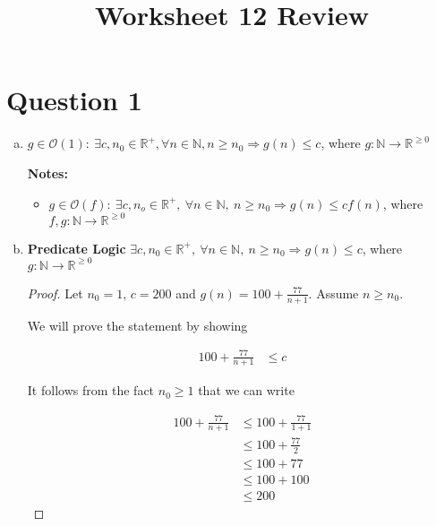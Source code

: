 \documentclass[12pt]{article}
\begin{document}
\title{Worksheet 12 Review}
\maketitle

\section*{Question 1}
\begin{enumerate}[a.]
    \item

    $g \in \mathcal{O}(1):\:\exists c,n_0 \in \mathbb{R}^{+}, \forall n \in
    \mathbb{N}, n \geq n_0 \Rightarrow g(n) \leq c$, where $g: \mathbb{N} \to \mathbb{R}^{\geq 0}$

    \bigskip

    \textbf{Notes:}

    \begin{itemize}
        \item

        $g \in \mathcal{O}(f):\:\exists c,n_o \in \mathbb{R}^{+},\:\forall n \in
        \mathbb{N},\:n \geq n_0 \Rightarrow g(n) \leq cf(n)$, where $f,g:\mathbb{N} \to \mathbb{R}^{\geq 0}$

    \end{itemize}

    \item

    \textbf{Predicate Logic} $\exists c,n_0 \in \mathbb{R}^{+},\:\forall n \in
    \mathbb{N},\:n \geq n_0 \Rightarrow g(n) \leq c$, where $g: \mathbb{N} \to \mathbb{R}^{\geq 0}$

    \bigskip

    \begin{proof}
        Let $n_0 = 1$, $c = 200$ and $g(n) = 100 + \frac{77}{n+1}$. Assume $n \geq n_0$.

        \bigskip

        We will prove the statement by showing

        \begin{align}
            100 + \frac{77}{n+1} &\leq c
        \end{align}

        \bigskip

        It follows from the fact $n_0 \geq 1$ that we can write

        \begin{align}
            100 + \frac{77}{n+1} &\leq 100 + \frac{77}{1+1}\\
            &\leq 100 + \frac{77}{2}\\
            &\leq 100 + 77\\
            &\leq 100 + 100\\
            &\leq 200
        \end{align}


\end{proof}
\end{enumerate}
\end{document}
